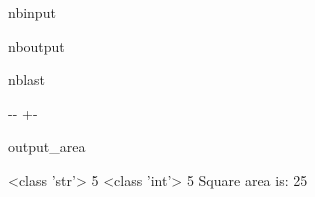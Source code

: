 \documentclass[letterpaper,10pt,english]{sphinxmanual}
\begin{document}
\begin{sphinxuseclass}{nbinput}
{
\begin{sphinxVerbatim}[commandchars=\\\{\}]
\llap{\color{nbsphinxin}[19]:\,\hspace{\fboxrule}\hspace{\fboxsep}}  
  
  
\end{sphinxVerbatim}
}

\end{sphinxuseclass}
\begin{sphinxuseclass}{nboutput}
\begin{sphinxuseclass}{nblast}
{

\kern-\sphinxverbatimsmallskipamount\kern-\baselineskip
\kern+\FrameHeightAdjust\kern-\fboxrule
\vspace{\nbsphinxcodecellspacing}

\begin{sphinxuseclass}{output_area}
\begin{sphinxuseclass}{}


\begin{sphinxVerbatim}[commandchars=\\\{\}]
<class 'str'>
5
<class 'int'>
5
Square area is: 25
\end{sphinxVerbatim}



\end{sphinxuseclass}
\end{sphinxuseclass}
}

\end{sphinxuseclass}
\end{sphinxuseclass}
\end{document}
